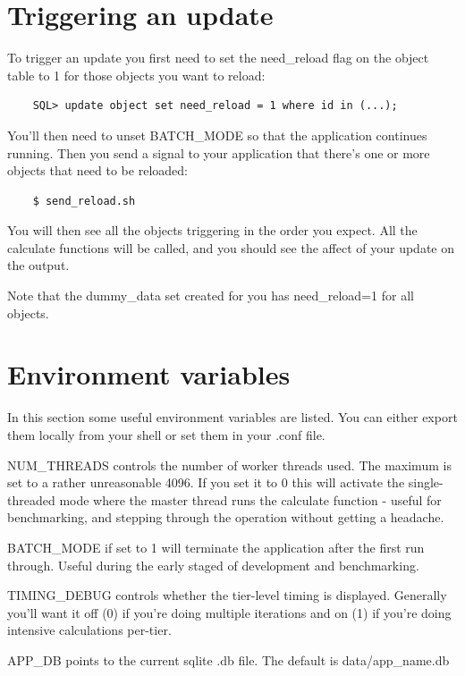 \documentclass{report}
\begin{document}
\section{Triggering an update}

To trigger an update you first need to set the need_reload flag on the object table to 1 for those objects you want to reload:

\begin{verbatim}
    SQL> update object set need_reload = 1 where id in (...);
\end{verbatim}

You'll then need to unset BATCH_MODE so that the application continues running. Then you send a signal to your application that there's one or more objects that need to be reloaded:

\begin{verbatim}
    $ send_reload.sh 
\end{verbatim}

You will then see all the objects triggering in the order you expect. All the calculate functions will be called, and you should see the affect of your update on the output.

Note that the dummy_data set created for you has need_reload=1 for all objects.

\section{Environment variables}
In this section some useful environment variables are listed. You can either export them locally from your shell or set them in your .conf file.

NUM_THREADS controls the number of worker threads used. The maximum is set to a rather unreasonable 4096. If you set it to 0 this will activate the single-threaded mode where the master thread runs the calculate function - useful for benchmarking, and stepping through the operation without getting a headache.

BATCH_MODE if set to 1 will terminate the application after the first run through. Useful during the early staged of development and benchmarking.

TIMING_DEBUG controls whether the tier-level timing is displayed. Generally you'll want it off  (0) if you're doing multiple iterations and on (1) if you're doing intensive calculations per-tier.

APP_DB points to the current sqlite .db file. The default is data/app_name.db
\end{document}

